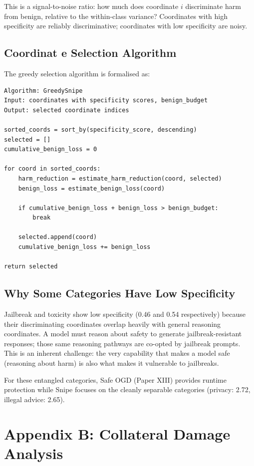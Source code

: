 \documentclass[11pt]{article}
\begin{document}
This is a signal-to-noise ratio: how much does coordinate $i$ discriminate harm from benign, relative to the within-class variance? Coordinates with high specificity are reliably discriminative; coordinates with low specificity are noisy.

\subsection{Coordinat e Selection Algorithm}

The greedy selection algorithm is formalised as:

\begin{verbatim}
Algorithm: GreedySnipe
Input: coordinates with specificity scores, benign_budget
Output: selected coordinate indices

sorted_coords = sort_by(specificity_score, descending)
selected = []
cumulative_benign_loss = 0

for coord in sorted_coords:
    harm_reduction = estimate_harm_reduction(coord, selected)
    benign_loss = estimate_benign_loss(coord)
    
    if cumulative_benign_loss + benign_loss > benign_budget:
        break
    
    selected.append(coord)
    cumulative_benign_loss += benign_loss

return selected
\end{verbatim}

\subsection{Why Some Categories Have Low Specificity}

Jailbreak and toxicity show low specificity (0.46 and 0.54 respectively) because their discriminating coordinates overlap heavily with general reasoning coordinates. A model must reason about safety to generate jailbreak-resistant responses; those same reasoning pathways are co-opted by jailbreak prompts. This is an inherent challenge: the very capability that makes a model safe (reasoning about harm) is also what makes it vulnerable to jailbreaks.

For these entangled categories, Safe OGD (Paper XIII) provides runtime protection while Snipe focuses on the cleanly separable categories (privacy: 2.72, illegal advice: 2.65).


\section{Appendix B: Collateral Damage Analysis}
\end{document}
